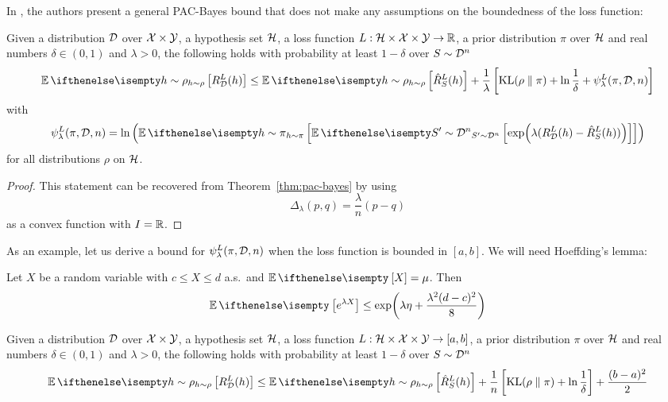 In \cite{alquier2016properties}, the authors present a general PAC-Bayes bound
that does not make any assumptions on the boundedness of the loss function:

\begin{theorem}
  Given a distribution $\mathcal{D}$ over $\mathcal{X} \times \mathcal{Y}$, a hypothesis set $\mathcal{H}$, a
  loss function $L : \mathcal{H} \times \mathcal{X} \times \mathcal{Y} \to \mathbb{R}$, a prior distribution
  $\pi$ over $\mathcal{H}$ and real numbers $\delta \in (0, 1)$ and $\lambda > 0$, the
  following holds with probability at least $1 - \delta$ over $S \sim \mathcal{D}^n$
  \begin{equation}
    \label{eq:alquier-bound}
    \Ev[h \sim \rho]{R_\CD^L(h)} \leq \Ev[h \sim \rho]{\hat{R}_S^L(h)} +
    \frac{1}{\lambda}\left[\KL{\rho}{\pi} + \ln \frac{1}{\delta} +
    \psi_\lambda^L(\pi, \CD, n)\right]
  \end{equation}
  with
  \begin{equation}
    \psi_\lambda^L(\pi, \CD, n) = \ln\left(\Ev[h \sim \pi]{\Ev[S' \sim
    \CD^n]{\exp(\lambda(R_\CD^L(h) - \hat{R}_S^L(h)))}}\right)
  \end{equation}
  for all distributions $\rho$ on $\mathcal{H}$.
\end{theorem}

\begin{proof}
  This statement can be recovered from Theorem~\ref{thm:pac-bayes} by using
  \begin{equation}
    \Delta_\lambda(p, q) = \frac{\lambda}{n} (p - q)
  \end{equation}
  as a convex function with $I = \mathbb{R}$.
\end{proof}

As an example, let us derive a bound for $\psi_\lambda^L(\pi, \mathcal{D}, n)$ when the
loss function is bounded in $[a, b]$. We will need Hoeffding's lemma:

\begin{lemma}
  Let $X$ be a random variable with $c \leq X \leq d$ a.s.\ and $\Ev{X} = \mu$.
  Then
  \begin{equation}
    \Ev{e^{\lambda X}} \leq \exp(\lambda \eta + \frac{\lambda^2 (d - c)^2}{8})
  \end{equation}
\end{lemma}

\begin{corollary}
  Given a distribution $\mathcal{D}$ over $\mathcal{X} \times \mathcal{Y}$, a hypothesis set $\mathcal{H}$, a
  loss function $L : \mathcal{H} \times \mathcal{X} \times \mathcal{Y} \to [a, b]$, a prior distribution
  $\pi$ over $\mathcal{H}$ and real numbers $\delta \in (0, 1)$ and $\lambda > 0$, the
  following holds with probability at least $1 - \delta$ over $S \sim \mathcal{D}^n$
  \begin{equation}
    \label{eq:alquier-bound-bounded-loss}
    \Ev[h \sim \rho]{R_\CD^L(h)} \leq \Ev[h \sim \rho]{\hat{R}_S^L(h)} +
    \frac{1}{n}\left[\KL{\rho}{\pi} + \ln \frac{1}{\delta}\right] + \frac{(b -
    a)^2}{2}
  \end{equation}
\end{corollary}

